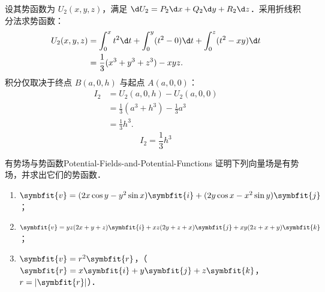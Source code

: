 \begin{solution}
    设其势函数为 $U_2(x, y, z)$，满足 $\d U_2 = P_2 \d x + Q_2 \d y + R_2 \d z$．采用折线积分法求势函数：
    \begin{equation}
        \label{eq:potential-2}
        \begin{aligned}
            U_2(x, y, z) & = \int_0^x t^2 \d t + \int_0^y (t^2 - 0) \d t + \int_0^z (t^2 - xy) \d t \\
                         & = \frac{1}{3}(x^3 + y^3 + z^3) - xyz.
        \end{aligned}
    \end{equation}
    积分仅取决于终点 $B(a,0,h)$ 与起点 $A(a,0,0)$：
    \begin{equation}
        \begin{aligned}
            I_2 & = U_2(a, 0, h) - U_2(a, 0, 0)             \\
                & = \frac{1}{3}(a^3 + h^3) - \frac{1}{3}a^3 \\
                & = \frac{1}{3}h^3.
        \end{aligned}
    \end{equation}
    \begin{equation}
        I_2 = \boxed{\frac{1}{3}h^3}
    \end{equation}
\end{solution}

\begin{problem}{有势场与势函数}{Potential-Fields-and-Potential-Functions}
    证明下列向量场是有势场，并求出它们的势函数．
    \begin{enumerate}
        \item $\symbfit{v} = (2x \cos y - y^2 \sin x)\symbfit{i} + (2y \cos x - x^2 \sin y)\symbfit{j}$；
        \item $\symbfit{v} = yz(2x + y + z)\symbfit{i} + xz(2y + z + x)\symbfit{j} + xy(2z + x + y)\symbfit{k}$；
        \item $\symbfit{v} = r^2\symbfit{r}$，（$\symbfit{r} = x\symbfit{i} + y\symbfit{j} + z\symbfit{k}$，$r = |\symbfit{r}|$）．
    \end{enumerate}
\end{problem}

